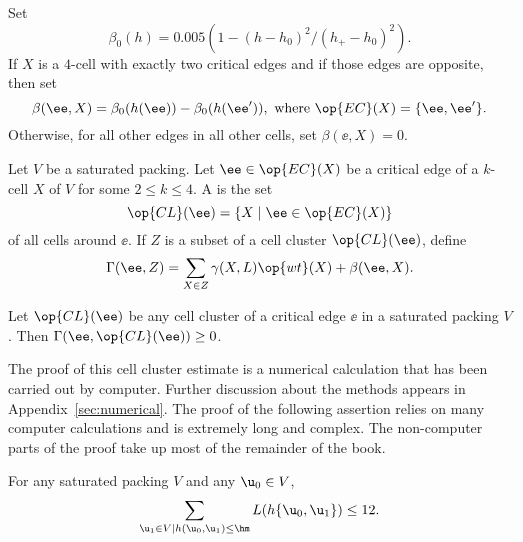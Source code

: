 \begin{definition}\label{def:beta} 
Set 
\[  
\beta_0(h) = 0.005 (1 - (h-h_0)^2/(h_+-h_0)^2).
\] 
If $X$ is a $4$-cell with exactly two critical edges and if those edges
are opposite, then set
\[  
\beta(\ee,X) = \beta_0(h(\ee)) - \beta_0(h(\ee')), 
\text{ where }\op{EC}(X) = \{\ee,\ee'\} .  
\] 
Otherwise, for all other edges in all other cells, set $\beta(\ee,X) = 0$.
\end{definition}
%
%

\begin{definition}\label{def:gammaL} 
  Let $V$ be a saturated packing.  Let $\ee\in \op{EC}(X)$ be a
  critical edge of a $k$-cell $X$ of $V$ for some $2\le k\le 4$.  A
   is the set
\[  
\op{CL}(\ee) = \{X\mid \ee\in \op{EC}(X)\} 
\] 
%
of all cells around $\ee$. 
If $Z$ is a subset of a cell cluster $\op{CL}(\ee)$, define
%
\[  
\Gamma(\ee,Z) = \sum_{X\in Z} \gamma(X,L) \op{wt}(X) +\beta(\ee,X).
\] 
%


\end{definition}
%

\begin{theorem} 
\label{lemma:cluster}
Let $\op{CL}(\ee)$ be any cell cluster of a critical edge $\ee$ in a saturated packing $V$.  
Then $\Gamma(\ee,\op{CL}(\ee))\ge 0$.
\end{theorem}

The proof of this cell cluster estimate is a numerical calculation
that has been carried out by computer.  Further discussion about the
methods appears in Appendix~\ref{sec:numerical}. The proof of the
following assertion relies on many computer calculations and is
extremely long and complex.  The non-computer parts of the proof take
up most of the remainder of the book.%
%
%

\begin{assertion}\label{conj:L12} 
  For any  saturated packing $ V$ and any $ \u_0\in V$,
\begin{equation}\label{eqn:L12} 
\sum_{ \u_1\in V\mid h( \u_0, \u_1)\le \hm} L(h\{\u_0, \u_1\}) \le 12.
\end{equation}
\end{assertion}

